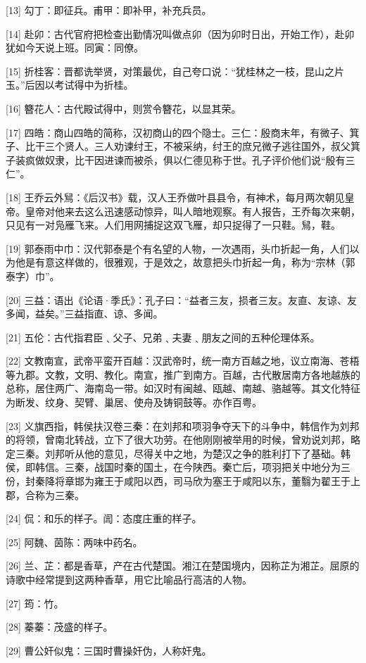 \documentclass[12pt,UTF8]{ctexbook}
\begin{document}
[13] 勾丁：即征兵。甫甲：即补甲，补充兵员。

[14] 赴卯：古代官府把检查出勤情况叫做点卯（因为卯时日出，开始工作），赴卯犹如今天说上班。同寅：同僚。

[15] 折桂客：晋都诜举贤，对策最优，自己夸口说：“犹桂林之一枝，昆山之片玉。”后因以考试得中为折桂。

[16] 簪花人：古代殿试得中，则赏令簪花，以显其荣。

[17] 四皓：商山四皓的简称，汉初商山的四个隐士。三仁：殷商末年，有微子、箕子、比干三个贤人。三人劝谏纣王，不被采纳，纣王的庶兄微子逃往国外，叔父箕子装疯做奴隶，比干因进谏而被杀，俱以仁德见称于世。孔子评价他们说“殷有三仁”。

[18] 王乔云外舃：《后汉书》载，汉人王乔做叶县县令，有神术，每月两次朝见皇帝。皇帝对他来去这么迅速感动惊异，叫人暗地观察。有人报告，王乔每次来朝，只见有一对凫雁飞来。人们用网捕捉这双飞雁，却只捉得了一只鞋。舃，鞋。

[19] 郭泰雨中巾：汉代郭泰是个有名望的人物，一次遇雨，头巾折起一角，人们以为他是有意这样做的，很雅观，于是效之，故意把头巾折起一角，称为“宗林（郭泰字）巾”。

[20] 三益：语出《论语·季氏》：孔子曰：“益者三友，损者三友。友直、友谅、友多闻，益矣。”三益指直、谅、多闻。

[21] 五伦：古代指君臣﹑父子、兄弟﹑夫妻﹑朋友之间的五种伦理体系。

[22] 文教南宣，武帝平蛮开百越：汉武帝时，统一南方百越之地，议立南海、苍梧等九郡。文教，文明、教化。南宣，推广到南方。百越，古代散居南方各地越族的总称，居住两广、海南岛一带。如汉时有闽越、瓯越、南越、骆越等。其文化特征为断发、纹身、契臂、巢居、使舟及铸铜鼓等。亦作百粤。

[23] 义旗西指，韩侯扶汉卷三秦：在刘邦和项羽争夺天下的斗争中，韩信作为刘邦的将领，曾南北转战，立下了很大功劳。在他刚刚被举用的时候，曾劝说刘邦，略定三秦。刘邦听从他的意见，尽得关中之地，为楚汉之争的胜利打下了基础。韩侯，即韩信。三秦，战国时秦的国土，在今陕西。秦亡后，项羽把关中地分为三份，封秦降将章邯为雍王于咸阳以西，司马欣为塞王于咸阳以东，董翳为翟王于上郡，合称为三秦。

[24] 侃：和乐的样子。訚：态度庄重的样子。

[25] 阿魏、茵陈：两味中药名。

[26] 兰、芷：都是香草，产在古代楚国。湘江在楚国境内，因称芷为湘芷。屈原的诗歌中经常提到这两种香草，用它比喻品行高洁的人物。

[27] 筠：竹。

[28] 蓁蓁：茂盛的样子。

[29] 曹公奸似鬼：三国时曹操奸伪，人称奸鬼。
\end{document}
